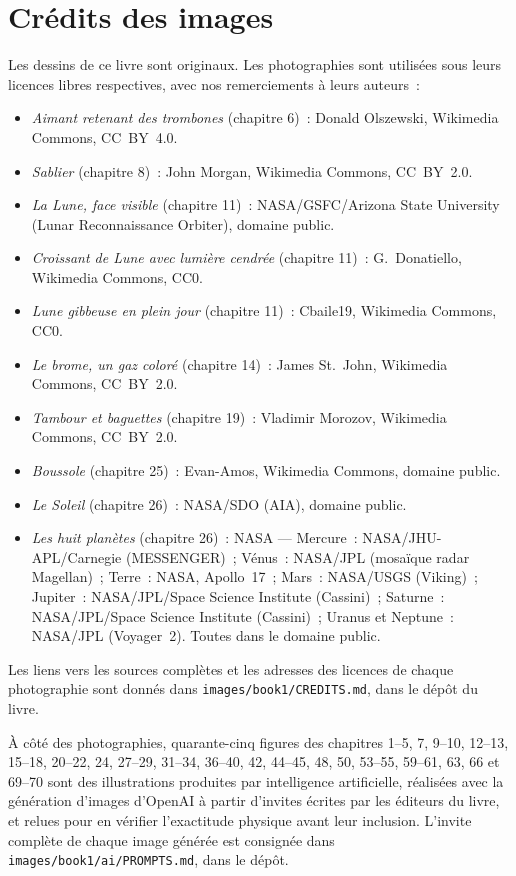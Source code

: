 \chapter*{Crédits des images}

Les dessins de ce livre sont originaux. Les photographies sont
utilisées sous leurs licences libres respectives, avec nos
remerciements à leurs auteurs~:

\begin{itemize}
  \item \emph{Aimant retenant des trombones} (chapitre 6)~: Donald
        Olszewski, Wikimedia Commons, CC~BY~4.0.
  \item \emph{Sablier} (chapitre 8)~: John Morgan, Wikimedia
        Commons, CC~BY~2.0.
  \item \emph{La Lune, face visible} (chapitre 11)~: NASA/GSFC/Arizona
        State University (Lunar Reconnaissance Orbiter), domaine
        public.
  \item \emph{Croissant de Lune avec lumière cendrée} (chapitre 11)~:
        G.~Donatiello, Wikimedia Commons, CC0.
  \item \emph{Lune gibbeuse en plein jour} (chapitre 11)~: Cbaile19,
        Wikimedia Commons, CC0.
  \item \emph{Le brome, un gaz coloré} (chapitre 14)~: James
        St.~John, Wikimedia Commons, CC~BY~2.0.
  \item \emph{Tambour et baguettes} (chapitre 19)~: Vladimir Morozov,
        Wikimedia Commons, CC~BY~2.0.
  \item \emph{Boussole} (chapitre 25)~: Evan-Amos, Wikimedia Commons,
        domaine public.
  \item \emph{Le Soleil} (chapitre 26)~: NASA/SDO (AIA), domaine
        public.
  \item \emph{Les huit planètes} (chapitre 26)~: NASA ---
        Mercure~: NASA/JHU-APL/Carnegie (MESSENGER)~; Vénus~:
        NASA/JPL (mosaïque radar Magellan)~; Terre~: NASA, Apollo~17~;
        Mars~: NASA/USGS (Viking)~; Jupiter~: NASA/JPL/Space Science
        Institute (Cassini)~; Saturne~: NASA/JPL/Space Science
        Institute (Cassini)~; Uranus et Neptune~: NASA/JPL
        (Voyager~2). Toutes dans le domaine public.
\end{itemize}

Les liens vers les sources complètes et les adresses des licences de
chaque photographie sont donnés dans
\texttt{images/book1/CREDITS.md}, dans le dépôt du livre.

\bigskip
À côté des photographies, quarante-cinq figures des chapitres 1--5,
7, 9--10, 12--13, 15--18, 20--22, 24, 27--29, 31--34, 36--40, 42,
44--45, 48, 50, 53--55, 59--61, 63, 66 et 69--70 sont des
illustrations produites par intelligence artificielle, réalisées avec
la génération d'images d'OpenAI à partir d'invites écrites par les
éditeurs du livre, et relues pour en vérifier l'exactitude physique
avant leur inclusion. L'invite complète de chaque image générée est
consignée dans \texttt{images/book1/ai/PROMPTS.md}, dans le dépôt.
\clearpage
